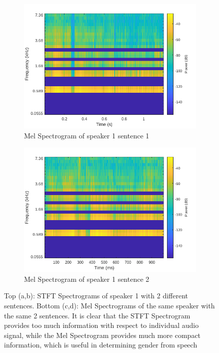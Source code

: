 \documentclass[11pt]{article}  %
\begin{document}
\begin{figure}[htb!]
	\begin{subfigure}[b]{.4\linewidth}
	\includegraphics[width=\textwidth]{mel1.png}
	\caption{Mel Spectrogram of speaker 1 sentence 1}
	\label{fig:mel-speaker1-sent-1}
	\end{subfigure}
	\begin{subfigure}[b]{.4\linewidth}
		\includegraphics[width=\textwidth]{mel2.png}
		\caption{Mel Spectrogram of speaker 1 sentence 2}
		\label{fig:mel-speaker1-sent-2}
	\end{subfigure}
	\caption{Top (a,b): STFT Spectrograms of speaker 1 with 2 different sentences. Bottom (c,d): Mel Spectrograms of the same speaker with the same 2 sentences. It is clear that the STFT Spectrogram provides too much information with respect to individual audio signal, while the Mel Spectrogram provides much more compact information, which is useful in determining gender from speech}
\end{figure}
\end{document}
